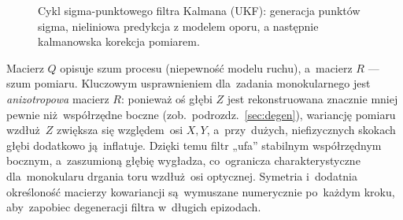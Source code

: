 \documentclass[14pt,a4paper]{extarticle}
\begin{document}
\begin{figure}[H]
\centering
{}
\caption{Cykl sigma-punktowego filtra Kalmana (UKF): generacja punktów sigma, nieliniowa
  predykcja z modelem oporu, a następnie kalmanowska korekcja pomiarem.}
\label{fig:ukf}
\end{figure}

Macierz $Q$ opisuje szum procesu (niepewność modelu ruchu), a~macierz $R$ --- szum pomiaru.
Kluczowym usprawnieniem dla~zadania monokularnego jest \emph{anizotropowa} macierz $R$:
ponieważ oś głębi $Z$ jest rekonstruowana znacznie mniej pewnie niż~współrzędne boczne
(zob.~podrozdz.~\ref{sec:degen}), wariancję pomiaru wzdłuż~$Z$ zwiększa się względem~osi
$X,Y$, a~przy~dużych, niefizycznych skokach głębi dodatkowo ją~inflatuje. Dzięki temu filtr
„ufa” stabilnym współrzędnym bocznym, a~zaszumioną głębię wygładza, co~ogranicza
charakterystyczne dla~monokularu drgania toru wzdłuż~osi optycznej. Symetria i~dodatnia
określoność macierzy kowariancji są~wymuszane numerycznie po~każdym kroku, aby~zapobiec
degeneracji filtra w~długich epizodach.
\end{document}
